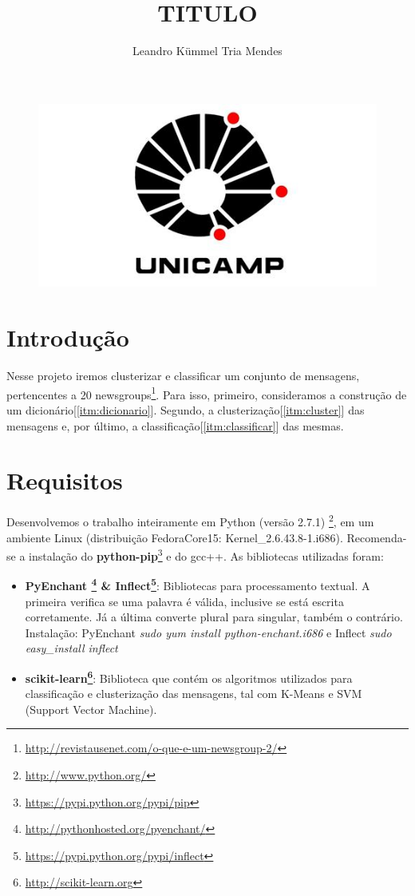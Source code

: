 \documentclass[a4paper,10pt]{article}
\title{TITULO}
\author{Leandro Kümmel Tria Mendes}
\begin{document}
\maketitle
\begin{figure}[!htb]
  \centering
  \includegraphics[scale=0.5]{logo.png}
\end{figure}
\newpage
\section{Introdução}
Nesse projeto iremos clusterizar e classificar um conjunto de mensagens, pertencentes a 20 newsgroups\footnote{\url{http://revistausenet.com/o-que-e-um-newsgroup-2/}}. Para isso, primeiro, consideramos a construção de um dicionário[\ref{itm:dicionario}]. Segundo, a clusterização[\ref{itm:cluster}] das mensagens e, por último, a classificação[\ref{itm:classificar}] das mesmas.
\section{Requisitos}
Desenvolvemos o trabalho inteiramente em Python (versão 2.7.1) \footnote{\url{http://www.python.org/}}, em um ambiente Linux (distribuição FedoraCore15: Kernel\_2.6.43.8-1.i686). Recomenda-se a instalação do \textbf{python-pip}\footnote{\url{https://pypi.python.org/pypi/pip}} e do gcc++. As bibliotecas utilizadas foram:
\begin{itemize}
\item \label{itm:proctext} \textbf{PyEnchant \footnote{\url{http://pythonhosted.org/pyenchant/}} \& Inflect\footnote{\url{https://pypi.python.org/pypi/inflect}}}: Bibliotecas para processamento textual. A primeira verifica se uma palavra é válida, inclusive se está escrita corretamente. Já a última converte plural para singular, também o contrário. Instalação: PyEnchant \emph{sudo yum install python-enchant.i686} e Inflect \emph{sudo easy\_install inflect}
\item \label{itm:scikit} \textbf{scikit-learn\footnote{\url{http://scikit-learn.org}}}: Biblioteca que contém os algoritmos utilizados para classificação e clusterização das mensagens, tal com K-Means e SVM (Support Vector Machine).
\end{itemize}
\end{document}
